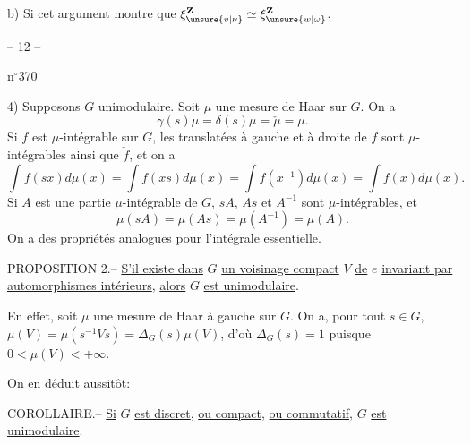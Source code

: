 b) Si 
cet argument montre que
$\xi_{\unsure{v|\nu}}^{\mathbf Z}\simeq\xi_{\unsure{w|\omega}}^{\mathbf Z}$.


\begin{center}-- 12 --\end{center}\hfill n$^\circ$370

4) Supposons $G$ unimodulaire. Soit $\mu$ une mesure de Haar sur $G$. On a
\[
\tag{26}\gamma(s)\mu=\delta(s)\mu=\check\mu=\mu.
\]
Si $f$ est $\mu$-intégrable sur $G$, les translatées à gauche et à droite de $f$ sont $\mu$-intégrables ainsi que $\check f$, et on a
\[
\tag{27}\int f(sx)d\mu(x)=\int f(xs)d\mu(x)=\int f(x^{-1})d\mu(x)=\int f(x)d\mu(x).
\]
Si $A$ est une partie $\mu$-intégrable de $G$, $sA$, $As$ et $A^{-1}$ sont $\mu$-intégrables, et
\[
\tag{28}\mu(sA)=\mu(As)=\mu(A^{-1})=\mu(A).
\]
On a des propriétés analogues pour l'intégrale essentielle.

PROPOSITION 2.-- \uline{S'il existe dans} $G$ \uline{un voisinage compact} $V$ \uline{de} $e$ \uline{invariant par automorphismes intérieurs}, \uline{alors} $G$ \uline{est unimodulaire}.

En effet, soit $\mu$ une mesure de Haar à gauche sur $G$.
On a, pour tout $s\in G$,
$\mu(V)=\mu(s^{-1}Vs)=\Delta_G(s)\mu(V)$, d'où $\Delta_G(s)=1$ puisque $0<\mu(V)<+\infty$.

On en déduit aussitôt:

COROLLAIRE.-- \uline{Si} $G$ \uline{est discret}, \uline{ou compact}, \uline{ou commutatif}, $G$ \uline{est unimodulaire}.

